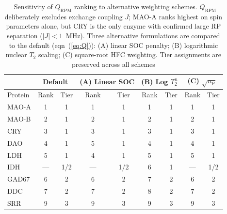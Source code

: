 \documentclass[twoside,twocolumn,9pt]{article}
\begin{document}
\begin{table}
\small
  \caption{\ Sensitivity of $Q_\mathrm{RPM}$ ranking to alternative weighting schemes. $Q_\mathrm{RPM}$ deliberately excludes exchange coupling $J$; MAO-A ranks highest on spin parameters alone, but CRY is the only enzyme with confirmed large RP separation ($|J| < 1$~MHz). Three alternative formulations are compared to the default (eqn~(\ref{eq:Q})): (A) linear SOC penalty; (B) logarithmic nuclear $T_2$ scaling; (C) square-root HFC weighting. Tier assignments are preserved across all schemes}
  \label{tab:ext_sensitivity}
  \begin{tabular*}{\textwidth}{@{\extracolsep{\fill}}lcccccccc}
    \hline
     & \multicolumn{2}{c}{Default} & \multicolumn{2}{c}{(A) Linear SOC} & \multicolumn{2}{c}{(B) Log $T_2^n$} & \multicolumn{2}{c}{(C) $\sqrt{n_\mathrm{P}}$} \\
    \hline
    Protein & Rank & Tier & Rank & Tier & Rank & Tier & Rank & Tier \\
    \hline
    MAO-A  & 1 & 1 & 1 & 1 & 1 & 1 & 1 & 1 \\
    MAO-B  & 2 & 1 & 2 & 1 & 2 & 1 & 2 & 1 \\
    CRY    & 3 & 1 & 3 & 1 & 3 & 1 & 3 & 1 \\
    DAO    & 4 & 1 & 5 & 1 & 4 & 1 & 4 & 1 \\
    LDH    & 5 & 1 & 4 & 1 & 5 & 1 & 5 & 1 \\
    IDH    & --- & 1/2 & --- & 1/2 & 6 & 1 & --- & 1/2 \\
    GAD67  & 6 & 2 & 6 & 2 & 7 & 2 & 6 & 2 \\
    DDC    & 7 & 2 & 7 & 2 & 8 & 2 & 7 & 2 \\
    SRR    & 9 & 3 & 9 & 3 & 9 & 3 & 9 & 3 \\
    \hline
  \end{tabular*}
\end{table}
\end{document}
